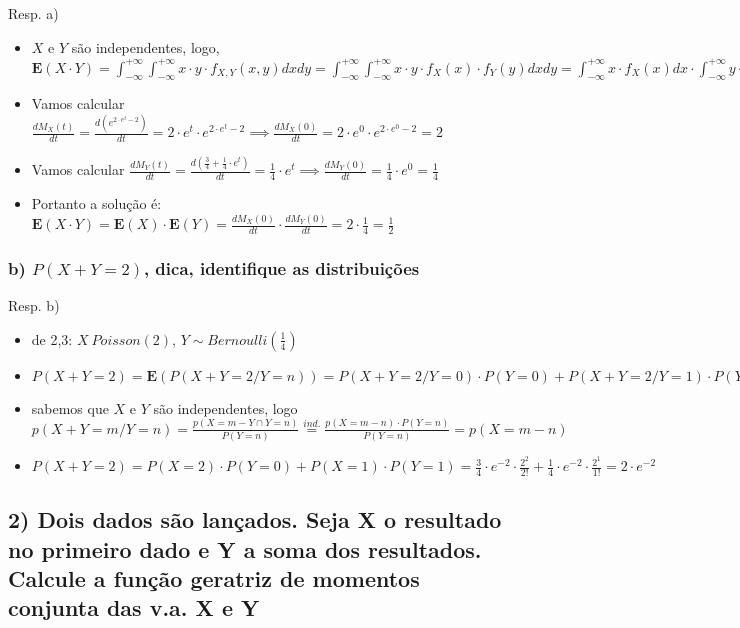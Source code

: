 \documentclass[english]{article}
\begin{document}
Resp. a)
\begin{itemize}
\item $X$ e $Y$ são independentes, logo, $\mathbf{E}(X\cdot Y)=\int_{-\infty}^{+\infty}\int_{-\infty}^{+\infty}x\cdot y\cdot f_{X,Y}(x,y)dxdy=\int_{-\infty}^{+\infty}\int_{-\infty}^{+\infty}x\cdot y\cdot f_{X}(x)\cdot f_{Y}(y)dxdy=\int_{-\infty}^{+\infty}x\cdot f_{X}(x)dx\cdot\int_{-\infty}^{+\infty}y\cdot f_{Y}(y)dy=\mathbf{E}(X)\cdot\mathbf{E}(Y)=\frac{dM_{X}(0)}{dt}\cdot\frac{dM_{Y}(0)}{dt}$
\item Vamos calcular $\frac{dM_{X}(t)}{dt}=\frac{d(e^{2\cdot e^{t}-2})}{dt}=2\cdot e^{t}\cdot e^{2\cdot e^{t}-2}\implies\frac{dM_{X}(0)}{dt}=2\cdot e^{0}\cdot e^{2\cdot e^{0}-2}=2$
\item Vamos calcular $\frac{dM_{Y}(t)}{dt}=\frac{d(\frac{3}{4}+\frac{1}{4}\cdot e^{t})}{dt}=\frac{1}{4}\cdot e^{t}\implies\frac{dM_{Y}(0)}{dt}=\frac{1}{4}\cdot e^{0}=\frac{1}{4}$
\item Portanto a solução é: $\mathbf{E}(X\cdot Y)=\mathbf{E}(X)\cdot\mathbf{E}(Y)=\frac{dM_{X}(0)}{dt}\cdot\frac{dM_{Y}(0)}{dt}=2\cdot\frac{1}{4}=\frac{1}{2}$
\end{itemize}

\subsubsection*{\textmd{b) $P(X+Y=2)$, dica, identifique as distribuições}}

Resp. b)
\begin{itemize}
\item de 2,3: $X~Poisson(2)$, $Y\sim Bernoulli(\frac{1}{4})$
\item $P(X+Y=2)=\mathbf{E}(P(X+Y=2/Y=n))=P(X+Y=2/Y=0)\cdot P(Y=0)+P(X+Y=2/Y=1)\cdot P(Y=1)$
\item sabemos que $X$ e $Y$ são independentes, logo $p(X+Y=m/Y=n)=\frac{p(X=m-Y\cap Y=n)}{P(Y=n)}\overset{ind.}{=}\frac{p(X=m-n)\cdot P(Y=n)}{P(Y=n)}=p(X=m-n)$
\item $P(X+Y=2)=P(X=2)\cdot P(Y=0)+P(X=1)\cdot P(Y=1)=\frac{3}{4}\cdot e^{-2}\cdot\frac{2^{2}}{2!}+\frac{1}{4}\cdot e^{-2}\cdot\frac{2^{1}}{1!}=2\cdot e^{-2}$
\end{itemize}

\subsection*{\textcompwordmark{}}


\subsection*{\textmd{2) Dois dados são lançados. Seja X o resultado no primeiro
dado e Y a soma dos resultados. Calcule a função geratriz de momentos
conjunta das v.a. X e Y}}
\end{document}

